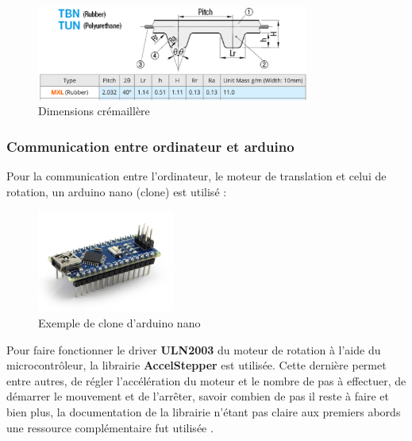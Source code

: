 \begin{figure}[H]
    \centering
    \includegraphics[width=0.8\textwidth]{assets/figures/ameliorations/dimensions_cremaillere.png}
    \caption[Dimensions crémaillère]{Dimensions crémaillère\autocite{dimensions_courroies_mxl}}
\end{figure}




\subsubsection{Communication entre ordinateur et arduino}\label{sec:comm_ordi_arduino}

Pour la communication entre l'ordinateur, le moteur de translation et celui de rotation, un arduino nano (clone) est utilisé :
\begin{figure}[H]
    \centering
    \includegraphics[width = 0.4\textwidth]{assets/figures/ameliorations/arduino_nano.jpg}
    \caption[Exemple de clone d'arduino nano]{Exemple de clone d'arduino nano \autocite{clone_nano}}
\end{figure}

Pour faire fonctionner le driver \textbf{ULN2003} du moteur de rotation à l'aide du microcontrôleur, la librairie \textbf{AccelStepper}\autocite{librairie_accelstepper} est utilisée.
Cette dernière permet entre autres, de régler l'accélération du moteur et le nombre de pas à effectuer, de démarrer le mouvement et de l'arrêter, savoir combien de pas il reste à faire et bien plus,
la documentation de la librairie n'étant pas claire aux premiers abords une ressource complémentaire fut utilisée \autocite{AccelStepper_manual}.

